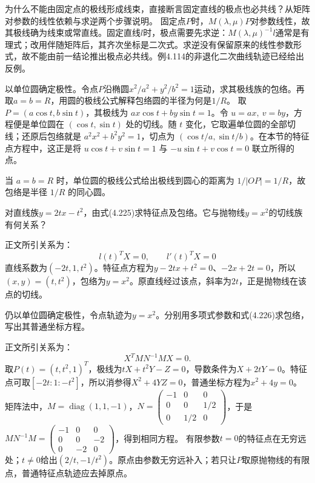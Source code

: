 为什么不能由固定点的极线形成线束，直接断言固定直线的极点也必共线？从矩阵对参数的线性依赖与求逆两个步骤说明。
\solutionanswer
固定点\(P\)时，\(M(\lambda,\mu)P\)对参数线性，故其极线确为线束或常直线。固定直线\(l\)时，极点需要先求逆：\(M(\lambda,\mu)^{-1}l\)通常是有理式；改用伴随矩阵后，其齐次坐标是二次式。求逆没有保留原来的线性参数形式，故不能由前一结论推出极点必共线。例4.114的非退化二次曲线轨迹已经给出反例。


以单位圆确定极性。令点\(P\)沿椭圆\(x^2/a^2+y^2/b^2=1\)运动，求其极线族的包络。再取\(a=b=R\)，用圆的极线公式解释包络圆的半径为何是\(1/R\)。
\solutionanswer
取 \(P=(a\cos t,b\sin t)\)，其极线为 \(ax\cos t+by\sin t=1\)。令 \(u=ax,\ v=by\)，方程便是单位圆在 \((\cos t,\sin t)\) 处的切线。随 \(t\) 变化，它取遍单位圆的全部切线；还原后包络就是 \(a^2x^2+b^2y^2=1\)，切点为 \((\cos t/a,\sin t/b)\)。在本节的特征点方程中，这正是将 \(u\cos t+v\sin t=1\) 与 \(-u\sin t+v\cos t=0\) 联立所得的点。

当 \(a=b=R\) 时，单位圆的极线公式给出极线到圆心的距离为 \(1/|OP|=1/R\)，故包络是半径 \(1/R\) 的同心圆。


对直线族\(y=2tx-t^2\)，由式\textup{(4.225)}求特征点及包络。它与抛物线\(y=x^2\)的切线族有何关系？

\par\smallskip\noindent 正文所引关系为：
\begin{equation*}
l(t)^TX=0,\qquad l'(t)^TX=0
\end{equation*}
\solutionanswer
直线系数为\((-2t,1,t^2)\)。特征点方程为\(y-2tx+t^2=0\)、\(-2x+2t=0\)，所以\((x,y)=(t,t^2)\)，包络为\(y=x^2\)。原直线经过该点，斜率为\(2t\)，正是抛物线在该点的切线。


仍以单位圆确定极性，令点轨迹为\(y=x^2\)。分别用多项式参数和式\textup{(4.226)}求包络，写出其普通坐标方程。

\par\smallskip\noindent 正文所引关系为：
\begin{equation*}
X^TMN^{-1}MX=0.
\end{equation*}
\solutionanswer
取\(P(t)=(t,t^2,1)^T\)，极线为\(tX+t^2Y-Z=0\)，导数条件为\(X+2tY=0\)。特征点可取\([-2t:1:-t^2]\)，所以消参得\(X^2+4YZ=0\)，普通坐标方程为\(x^2+4y=0\)。
矩阵法中，\(M=\operatorname{diag}(1,1,-1)\)，\(N=\left(\begin{smallmatrix}-1&0&0\\0&0&1/2\\0&1/2&0\end{smallmatrix}\right)\)，于是\(MN^{-1}M=\left(\begin{smallmatrix}-1&0&0\\0&0&-2\\0&-2&0\end{smallmatrix}\right)\)，得到相同方程。
有限参数\(t=0\)的特征点在无穷远处；\(t\ne0\)给出\((2/t,-1/t^2)\)。原点由参数无穷远补入；若只让\(P\)取原抛物线的有限点，普通特征点轨迹应去掉原点。


